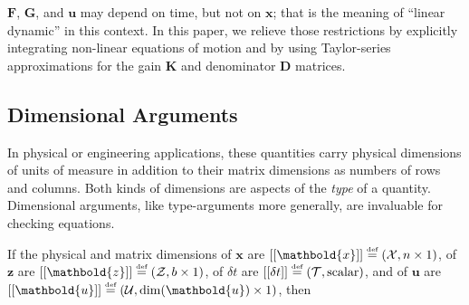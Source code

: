 \documentclass[10pt,oneside,x11names]{article}
\begin{document}
\noindent  \(\mathbold{F}\), \(\mathbold{G}\), and \(\mathbold{u}\) may depend
on time, but not on \(\mathbold{x}\); that is the meaning of ``linear dynamic'' in
this context. In this paper, we relieve those restrictions
by explicitly integrating non-linear equations of motion and by using
Taylor-series approximations for the gain \(\mathbold{K}\) and 
denominator \(\mathbold{D}\) matrices. 

\subsection{Dimensional Arguments}
\label{sec:orgheadline2}

In physical or engineering applications, these quantities carry physical
dimensions of units of measure in addition to their matrix dimensions as numbers
of rows and columns. Both kinds of dimensions are aspects of the \emph{type} of a
quantity. Dimensional arguments, like type-arguments more generally, are
invaluable for checking equations.

If the physical and matrix dimensions of 
\(\mathbold{x}\) 
are
\(\left[\left[\mathbold{x}\right]\right]
\stackrel{\text{\tiny def}}{=}
(\mathcal{X}, n\times{1})\),
of 
\(\mathbold{z}\) 
are
\(\left[\left[\mathbold{z}\right]\right]
\stackrel{\text{\tiny def}}{=}
(\mathcal{Z}, b\times{1})\), 
of 
\(\delta{t}\)
are
\(\left[\left[\delta{t}\right]\right]
\stackrel{\text{\tiny def}}{=}
(\mathcal{T}, \textrm{scalar})\), 
and of
\(\mathbold{u}\)
are
\(\left[\left[\mathbold{u}\right]\right]
\stackrel{\text{\tiny def}}{=}
(\mathcal{U}, \dim(\mathbold{u})\times{1})\), 
then
\end{document}
